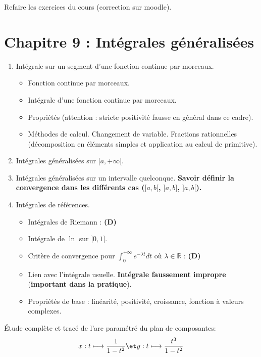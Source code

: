 \documentclass[twoside,a4paper,french,10pt]{VcCours}
\begin{document}
  Refaire les exercices du cours (correction sur moodle).
  
  \section*{Chapitre 9 : Intégrales généralisées}

  \begin{enumerate}
  \item Intégrale sur un segment d'une fonction continue par morceaux. 
  \begin{itemize}
  \item Fonction continue par morceaux.
  \item Intégrale d'une fonction continue par morceaux.
  \item Propriétés (attention : stricte positivité fausse en général dans ce cadre).
  \item Méthodes de calcul. Changement de variable. Fractions rationnelles (décomposition en éléments simples et application au calcul de primitive).
  \end{itemize}
  \item Intégrales généralisées sur $[a, + \infty[$.
  \item Intégrales généralisées sur un intervalle quelconque. \textbf{Savoir définir la convergence dans les différents cas ($[a,b[$, $]a,b]$, $]a,b[$).}
  \item Intégrales de références.
  \begin{itemize}
  \item Intégrales de Riemann : \textbf{(D)}
  \item Intégrale de $\ln$ sur $]0,1]$.
  \item Critère de convergence pour $\int_{0}^{+ \infty} e^{-\lambda t} dt$ où $\lambda \in \mathbb{R}$ : \textbf{(D)}
  \item Lien avec l'intégrale usuelle. \textbf{Intégrale faussement impropre} (\textbf{important dans la pratique}).
  \item Propriétés de base : linéarité, positivité, croissance, 
  fonction à valeurs complexes.
  \end{itemize}
  \end{enumerate}
  
  \begin{Exercice}
    Étude complète et tracé de l'arc paramétré du plan de composantes:
    \[x:t\longmapsto\frac{1}{1-t^2} \et y:t\longmapsto\frac{t^3}{1-t^2}\]  
  \end{Exercice} 
  
\end{document}
